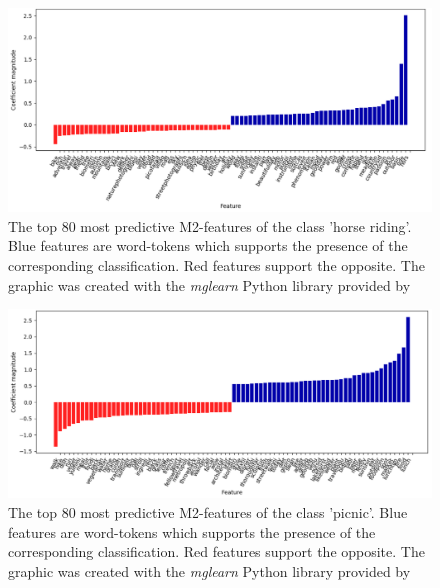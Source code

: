 \begin{figure}[h!]
   \centering
   \includegraphics[width=\textwidth]{img/m2_top40_features_horse_riding_cropped.pdf}
   \caption{The top 80 most predictive M2-features of the class 'horse riding'. Blue features are word-tokens which supports the presence of the corresponding classification. Red features support the opposite. The graphic was created with the \textit{mglearn} Python library provided by \textcite{Guido2016}}
   \label{fig:M2_top40_features_horse_riding}
\end{figure}
\begin{figure}[h!]
   \centering
   \includegraphics[width=\textwidth]{img/m2_top40_features_picnic_cropped.pdf}
   \caption{The top 80 most predictive M2-features of the class 'picnic'. Blue features are word-tokens which supports the presence of the corresponding classification. Red features support the opposite. The graphic was created with the \textit{mglearn} Python library provided by \textcite{Guido2016}}
   \label{fig:M2_top40_features_picnic}
\end{figure}
